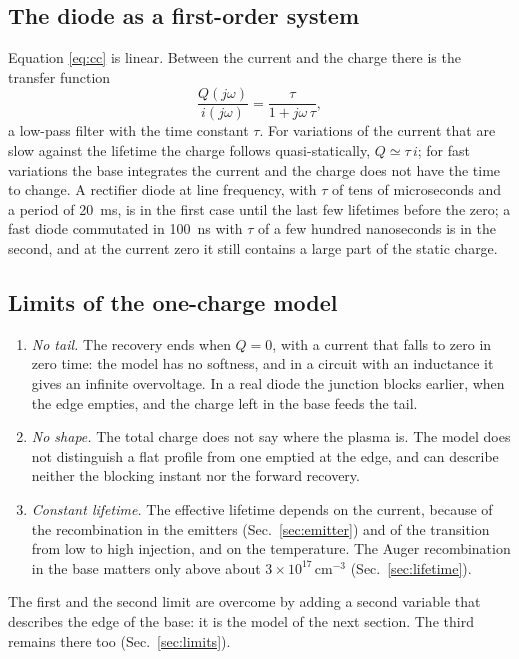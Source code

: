 \documentclass[10pt,a4paper]{scrartcl}
\newcommand{\cmc}{\si{\centi\metre^{-3}}}
\begin{document}
\subsection{The diode as a first-order system}
\label{sec:ccsystem}
Equation \eqref{eq:cc} is linear. Between the current and the charge there is the transfer function
\begin{equation}
\frac{Q(j\omega)}{i(j\omega)} = \frac{\tau}{1 + j\omega\,\tau} ,
\label{eq:cctf}
\end{equation}
a low-pass filter with the time constant $\tau$. For variations of the current that are slow against the lifetime the charge follows quasi-statically, $Q \simeq \tau\,i$; for fast variations the base integrates the current and the charge does not have the time to change. A rectifier diode at line frequency, with $\tau$ of tens of microseconds and a period of \SI{20}{\milli\second}, is in the first case until the last few lifetimes before the zero; a fast diode commutated in \SI{100}{\nano\second} with $\tau$ of a few hundred nanoseconds is in the second, and at the current zero it still contains a large part of the static charge.

\subsection{Limits of the one-charge model}
\label{sec:cclimits}
\begin{enumerate}
\item \emph{No tail.} The recovery ends when $Q = 0$, with a current that falls to zero in zero time: the model has no softness, and in a circuit with an inductance it gives an infinite overvoltage. In a real diode the junction blocks earlier, when the edge empties, and the charge left in the base feeds the tail.
\item \emph{No shape.} The total charge does not say where the plasma is. The model does not distinguish a flat profile from one emptied at the edge, and can describe neither the blocking instant nor the forward recovery.
\item \emph{Constant lifetime.} The effective lifetime depends on the current, because of the recombination in the emitters (Sec.~\ref{sec:emitter}) and of the transition from low to high injection, and on the temperature. The Auger recombination in the base matters only above about $3\times10^{17}\,\cmc$ (Sec.~\ref{sec:lifetime}).
\end{enumerate}
The first and the second limit are overcome by adding a second variable that describes the edge of the base: it is the model of the next section. The third remains there too (Sec.~\ref{sec:limits}).
\end{document}
